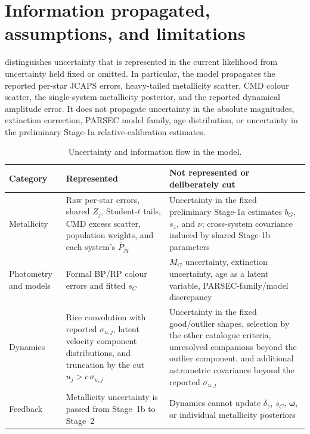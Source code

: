 \section{Information propagated, assumptions, and limitations}
\label{sec:limitations}

 distinguishes uncertainty that is represented in the
current likelihood from uncertainty held fixed or omitted.  In particular, the
model propagates the reported per-star JCAPS errors, heavy-tailed metallicity
scatter, CMD colour scatter, the single-system metallicity posterior, and the
reported dynamical amplitude error.  It does not propagate uncertainty in the
absolute magnitudes, extinction correction, PARSEC model family, age
distribution, or uncertainty in the preliminary Stage-1a relative-calibration
estimates.

\begin{table}[htbp]
\centering
\caption{Uncertainty and information flow in the model.}
\label{tab:uncertainties}
\begin{tabularx}{\textwidth}{@{}lXX@{}}
\toprule
Category & Represented & Not represented or deliberately cut \\
\midrule
Metallicity & Raw per-star errors, shared $Z_j$, Student-$t$ tails,
CMD excess scatter, population weights, and each system's $\overline P_{jq}$
& Uncertainty in the fixed preliminary Stage-1a estimates $b_G$, $s_z$, and
$\nu$; cross-system covariance induced by shared Stage-1b parameters \\
Photometry and models & Formal BP/RP colour errors and fitted $s_C$
& $M_G$ uncertainty, extinction uncertainty, age as a latent variable,
PARSEC-family/model discrepancy \\
Dynamics & Rice convolution with reported $\sigma_{u,j}$, latent velocity
component distributions, and truncation by the cut $u_j>c\,\sigma_{u,j}$ &
Uncertainty in the fixed good/outlier shapes, selection by the other
catalogue criteria, unresolved companions beyond the outlier component, and
additional astrometric covariance beyond the reported $\sigma_{u,j}$ \\
Feedback & Metallicity uncertainty is passed from Stage~1b to Stage~2
& Dynamics cannot update $\delta_z$, $s_C$, $\bm\omega$, or individual
metallicity posteriors \\
\bottomrule
\end{tabularx}
\end{table}

